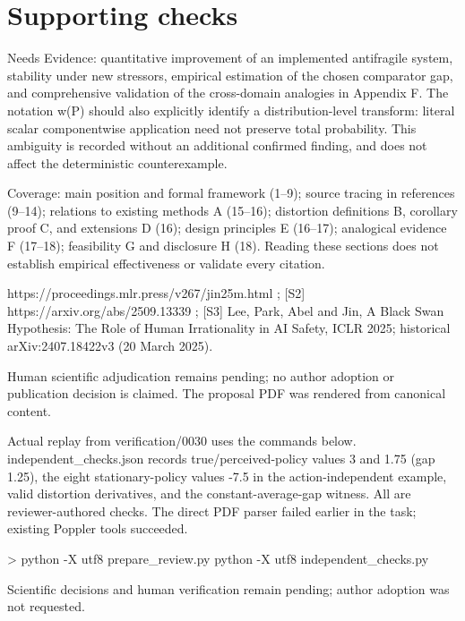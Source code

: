\documentclass[10pt]{article}
\begin{document}
\section*{Supporting checks}
Needs Evidence: quantitative improvement of an implemented antifragile system, stability under new stressors, empirical estimation of the chosen comparator gap, and comprehensive validation of the cross-domain analogies in Appendix F. The notation w(P) should also explicitly identify a distribution-level transform: literal scalar componentwise application need not preserve total probability. This ambiguity is recorded without an additional confirmed finding, and does not affect the deterministic counterexample.\par
Coverage: main position and formal framework (1–9); source tracing in references (9–14); relations to existing methods A (15–16); distortion definitions B, corollary proof C, and extensions D (16); design principles E (16–17); analogical evidence F (17–18); feasibility G and disclosure H (18). Reading these sections does not establish empirical effectiveness or validate every citation.\par
[S1] https://proceedings.mlr.press/v267/jin25m.html ; [S2] https://arxiv.org/abs/2509.13339 ; [S3] Lee, Park, Abel and Jin, A Black Swan Hypothesis: The Role of Human Irrationality in AI Safety, ICLR 2025; historical arXiv:2407.18422v3 (20 March 2025).\par
Human scientific adjudication remains pending; no author adoption or publication decision is claimed. The proposal PDF was rendered from canonical content.\par
Actual replay from verification/0030 uses the commands below. independent\_checks.json records true/perceived-policy values 3 and 1.75 (gap 1.25), the eight stationary-policy values -7.5 in the action-independent example, valid distortion derivatives, and the constant-average-gap witness. All are reviewer-authored checks. The direct PDF parser failed earlier in the task; existing Poppler tools succeeded.\par
> python -X utf8 prepare\_review.py python -X utf8 independent\_checks.py\par
Scientific decisions and human verification remain pending; author adoption was not requested.\par
\end{document}
